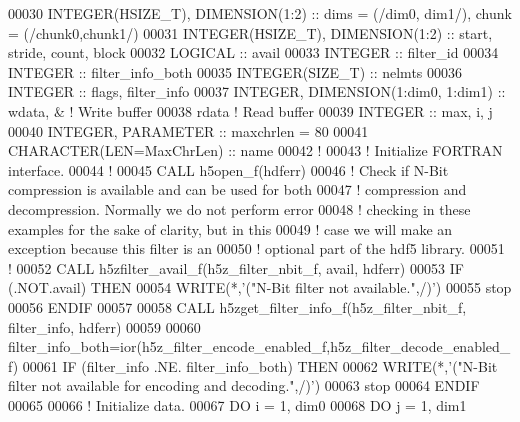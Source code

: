 \begin{DoxyCode}
00030   \textcolor{keywordtype}{INTEGER(HSIZE\_T)}, \textcolor{keywordtype}{DIMENSION(1:2)}   :: dims = (/dim0, dim1/), chunk = (/chunk0,chunk1/)
00031   \textcolor{keywordtype}{INTEGER(HSIZE\_T)}, \textcolor{keywordtype}{DIMENSION(1:2)}   :: start, stride, count, block
00032   \textcolor{keywordtype}{LOGICAL} :: avail
00033   \textcolor{keywordtype}{INTEGER} :: filter\_id
00034   \textcolor{keywordtype}{INTEGER} :: filter\_info\_both
00035   \textcolor{keywordtype}{INTEGER(SIZE\_T)} :: nelmts
00036   \textcolor{keywordtype}{INTEGER} :: flags, filter\_info
00037   \textcolor{keywordtype}{INTEGER}, \textcolor{keywordtype}{DIMENSION(1:dim0, 1:dim1)} :: wdata, & \textcolor{comment}{! Write buffer }
00038                                         rdata    \textcolor{comment}{! Read buffer}
00039   \textcolor{keywordtype}{INTEGER} :: max, i, j
00040   \textcolor{keywordtype}{INTEGER}, \textcolor{keywordtype}{PARAMETER} :: maxchrlen = 80
00041   \textcolor{keywordtype}{CHARACTER(LEN=MaxChrLen)} :: name
00042   \textcolor{comment}{!}
00043   \textcolor{comment}{! Initialize FORTRAN interface.}
00044   \textcolor{comment}{!}
00045   \textcolor{keyword}{CALL }h5open\_f(hdferr)
00046   \textcolor{comment}{! Check if N-Bit compression is available and can be used for both}
00047   \textcolor{comment}{! compression and decompression.  Normally we do not perform error}
00048   \textcolor{comment}{! checking in these examples for the sake of clarity, but in this}
00049   \textcolor{comment}{! case we will make an exception because this filter is an}
00050   \textcolor{comment}{! optional part of the hdf5 library.}
00051   \textcolor{comment}{!}
00052   \textcolor{keyword}{CALL }h5zfilter\_avail\_f(h5z\_filter\_nbit\_f, avail, hdferr)
00053   \textcolor{keywordflow}{IF} (.NOT.avail) \textcolor{keywordflow}{THEN}
00054      \textcolor{keyword}{WRITE}(*,\textcolor{stringliteral}{'("N-Bit filter not available.",/)'})
00055      stop
00056 \textcolor{keywordflow}{  ENDIF}
00057 
00058   \textcolor{keyword}{CALL }h5zget\_filter\_info\_f(h5z\_filter\_nbit\_f, filter\_info, hdferr)
00059 
00060   filter\_info\_both=ior(h5z\_filter\_encode\_enabled\_f,h5z\_filter\_decode\_enabled\_f)
00061   \textcolor{keywordflow}{IF} (filter\_info .NE. filter\_info\_both) \textcolor{keywordflow}{THEN}
00062      \textcolor{keyword}{WRITE}(*,\textcolor{stringliteral}{'("N-Bit filter not available for encoding and decoding.",/)'})
00063      stop
00064 \textcolor{keywordflow}{  ENDIF}
00065 
00066   \textcolor{comment}{! Initialize data.}
00067   \textcolor{keywordflow}{DO} i = 1, dim0
00068      \textcolor{keywordflow}{DO} j = 1, dim1

\end{DoxyCode}
